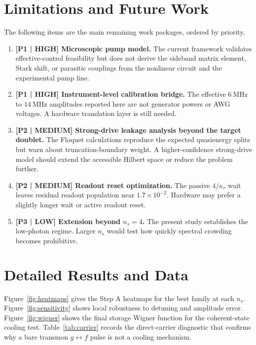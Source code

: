 \documentclass[aps,pra,twocolumn,reprint,floatfix,amsmath,amssymb]{revtex4-2}
\begin{document}
\section{Limitations and Future Work}
\label{sec:future}
The following items are the main remaining work packages, ordered by priority.

\begin{enumerate}
\item \textbf{[P1 | HIGH] Microscopic pump model.} The current framework validates effective-control feasibility but does not derive the sideband matrix element, Stark shift, or parasitic couplings from the nonlinear circuit and the experimental pump line.
\item \textbf{[P1 | HIGH] Instrument-level calibration bridge.} The effective \(\SI{6}{\mega\hertz}\) to \(\SI{14}{\mega\hertz}\) amplitudes reported here are not generator powers or AWG voltages. A hardware translation layer is still needed.
\item \textbf{[P2 | MEDIUM] Strong-drive leakage analysis beyond the target doublet.} The Floquet calculations reproduce the expected quasienergy splits but warn about truncation-boundary weight. A higher-confidence strong-drive model should extend the accessible Hilbert space or reduce the problem further.
\item \textbf{[P2 | MEDIUM] Readout reset optimization.} The passive \(4/\kappa_r\) wait leaves residual readout population near \(1.7\times10^{-2}\). Hardware may prefer a slightly longer wait or active readout reset.
\item \textbf{[P3 | LOW] Extension beyond \(n_s=4\).} The present study establishes the low-photon regime. Larger \(n_s\) would test how quickly spectral crowding becomes prohibitive.
\end{enumerate}




\appendix

\section{Detailed Results and Data}
\label{app:detailed}
Figure~\ref{fig:heatmaps} gives the Step A heatmaps for the best family at each \(n_s\). Figure~\ref{fig:sensitivity} shows local robustness to detuning and amplitude error. Figure~\ref{fig:wigner} shows the final storage Wigner function for the coherent-state cooling test. Table~\ref{tab:carrier} records the direct-carrier diagnostic that confirms why a bare transmon \(g\leftrightarrow f\) pulse is not a cooling mechanism.
\end{document}
